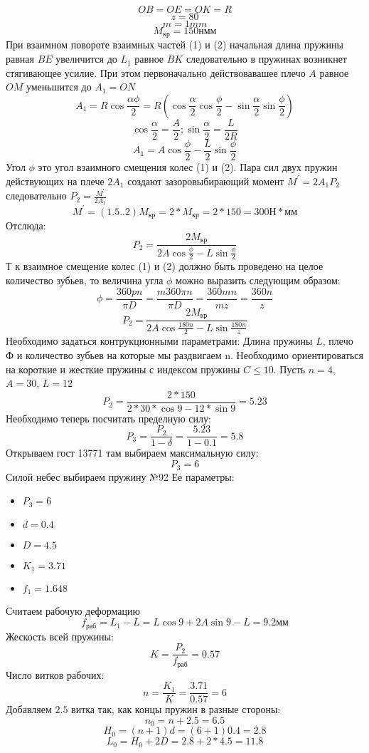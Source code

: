 \documentclass{article}
\begin{document}
$$
OB = OE = OK = R
$$
$$
z = 80
$$
$$
m = 1 mm
$$
$$
M_{кр} = 150 н мм
$$
При взаимном повороте взаимных частей (1) и (2) начальная длина пружины равная $BE$ увеличится до $L_1$ равное $BK$ следовательно в пружинах возникнет стягивающее усилие. При этом первоначально действовавашее плечо $A$ равное $OM$ уменьшится до $A_1 = ON$
$$
A_1 = R \cos{ \frac{ \alpha \phi}{2} } = R (\cos{ \frac{ \alpha}{2}}\cos{ \frac{ \phi}{2} } - \sin{ \frac{ \alpha}{2} } \sin{ \frac{ \phi}{2} })
$$
$$
\cos{ \frac{ \alpha}{2} } = \frac{A}{2}; \sin{ \frac{ \alpha}{2} } = \frac{L}{2R} 
$$
$$
A_1 = A \cos{ \frac{ \phi}{2}} - \frac{L}{2} \sin{ \frac{ \phi}{2} }
$$
Угол $ \phi$ это угол взаимного смещения колес (1) и (2). Пара сил двух пружин действующих на плече $2A_1$ создают зазоровыбирающий момент $M^{'} = 2 A_1 P_2$ следовательно $P_2 = \frac{M^{'}}{2A_1} $
$$
M^{'} = (1.5 .. 2) M_{кр} = 2 * M_{кр} = 2 * 150 = 300 Н * мм
$$
Отслюда:
$$
P_2 = \frac{2 M_{кр}}{2 A \cos{ \frac {\phi}{2}} - L \sin{ \frac{ \phi}{2} }} 
$$
Т к взаимное смещение колес (1) и (2) должно быть проведено на целое количество зубьев, то величина угла $ \phi$ можно выразить следующим образом:
$$
\phi = \frac{360 p n}{ \pi D } = \frac{m 360 \pi n}{ \pi D } = \frac{360 m n}{m z} = \frac{360 n}{z}
$$
$$
P_2 = \frac{2 M_{кр}}{2A\cos{ \frac{180 n}{2} } - L \sin { \frac{180 n}{z}} } 
$$
Необходимо задаться контрукционными параметрами: Длина пружины $L$, плечо Ф и количество зубьев на которые мы раздвигаем n. Необходимо ориентироваться на короткие и жесткие пружины с индексом пружины $C \le 10$. Пусть $n = 4$, $A = 30$, $L = 12$
$$
P_2 = \frac{2 * 150}{2 * 30 * \cos {9} - 12 * \sin {9}} = 5.23
$$
Необходимо теперь посчитать пределную силу:
$$
P_3 = \frac{P_2 }{1 - \delta} = \frac{5.23}{1 - 0.1} = 5.8
$$
Открываем гост 13771 там выбираем максимальную силу:
$$
P_3 = 6
$$
Силой небес выбираем пружину №92
Ее параметры:
\begin{itemize}
	\item $P_3 = 6$
	\item $d = 0.4$
	\item $D = 4.5$
	\item $K_1 = 3.71$
	\item $f_1 = 1.648$
\end{itemize}

Считаем рабочую деформацию
$$
f_{раб} = L_1 - L = L \cos{9} + 2A \sin{9} - L = 9.2 мм
$$
Жескость всей пружины:
$$
K = \frac{P_2}{f_{раб}} = 0.57
$$
Число витков рабочих:
$$
n = \frac{K_1}{K} = \frac{3.71}{0.57} = 6
$$
Добавляем $2.5$ витка так, как концы пружин в разные стороны:
$$
n_0 = n + 2.5 = 6.5
$$
$$
H_0 = (n + 1) d = (6 + 1) 0.4 = 2.8
$$
$$
L_0 = H_0 + 2 D = 2.8 + 2 * 4.5 = 11.8
$$
\end{document}
